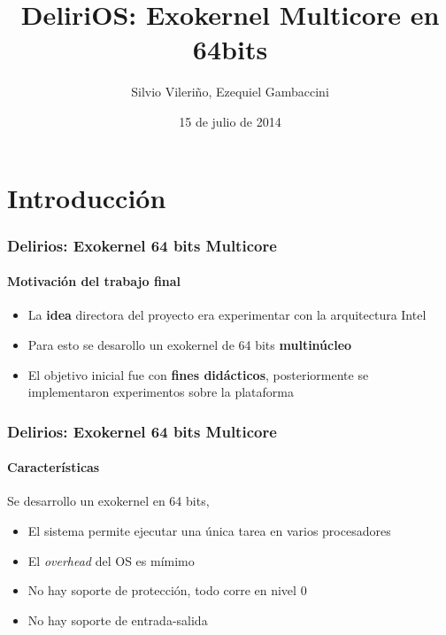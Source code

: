 \documentclass{beamer}
\title{DeliriOS: Exokernel Multicore en 64bits}
\author{Silvio Vileriño, Ezequiel Gambaccini}
\date{15 de julio de 2014}
\begin{document}
\begin{frame}
  \maketitle
\end{frame}

\section{Introducción}
  
\begin{frame}
  \frametitle{Delirios: Exokernel 64 bits Multicore}    
  \framesubtitle{Motivación del trabajo final}
  \begin{itemize}
    \setlength{\itemsep}{20pt}
    \item La \textbf{idea} directora del proyecto era experimentar con la arquitectura Intel
    \item Para esto se desarollo un exokernel de 64 bits \textbf{multinúcleo}
    \item El objetivo inicial fue con \textbf{fines didácticos}, posteriormente se implementaron experimentos sobre la plataforma
  \end{itemize}
\end{frame}
  
\begin{frame}
  \frametitle{Delirios: Exokernel 64 bits Multicore}
  \framesubtitle{Características}
  Se desarrollo un exokernel en 64 bits,
  \vspace{15pt}
  \begin{itemize}
    \setlength{\itemsep}{15pt}
    \item El sistema permite ejecutar una única tarea en varios procesadores
    \item El \emph{overhead} del OS es mímimo
    \item No hay soporte de protección, todo corre en nivel $0$
    \item No hay soporte de entrada-salida
  \end{itemize}
\end{frame}
\end{document}
